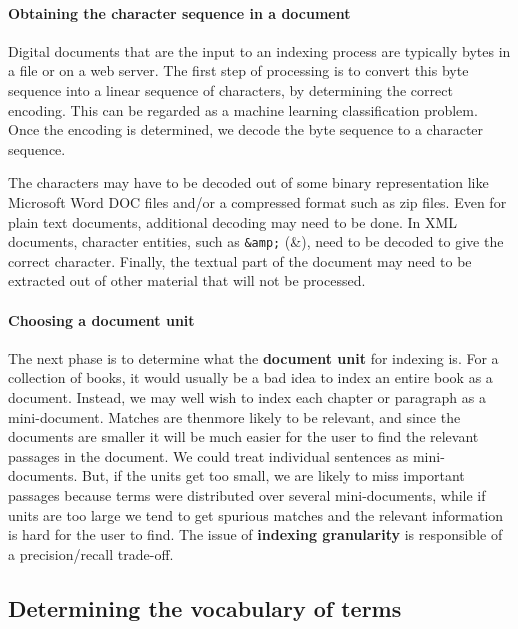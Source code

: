 \documentclass[letterpaper,11pt]{article}
\newcommand{\code}[1]{\texttt{#1}}
\begin{document}
\paragraph{Obtaining the character sequence in a document}
Digital documents that are the input to an indexing process are typically bytes in a file or on a web server. The first step of processing is to convert this byte sequence into a linear sequence of characters, by determining the correct encoding. This can be regarded as a machine learning classification problem. Once the encoding is determined, we decode the byte sequence to a character sequence. 

The characters may have to be decoded out of some binary representation like Microsoft Word DOC files and/or a compressed format such as zip files. Even for plain text documents, additional decoding may need to be done. In XML documents, character entities, such as \code{\&amp;} (\&), need to be decoded to give the correct character. Finally, the textual part of the document may need to be extracted out of other material that will not be processed.

\paragraph{Choosing a document unit}
The next phase is to determine what the \textbf{document unit} for indexing is. For a collection of books, it would usually be a bad idea to index an entire book as a document. Instead, we may well wish to index each chapter or paragraph as a mini-document. Matches are thenmore likely to be relevant, and since the documents are smaller it will be much easier for the user to find the relevant passages in the document. We could treat individual sentences as mini-documents. But, if the units get too small, we are likely to miss important passages because terms were distributed over several mini-documents, while if units are too large we tend to get spurious matches and the relevant information is hard for the user to find. The issue of \textbf{indexing granularity} is responsible of a precision/recall trade-off.

\subsection{Determining the vocabulary of terms}
\end{document}
